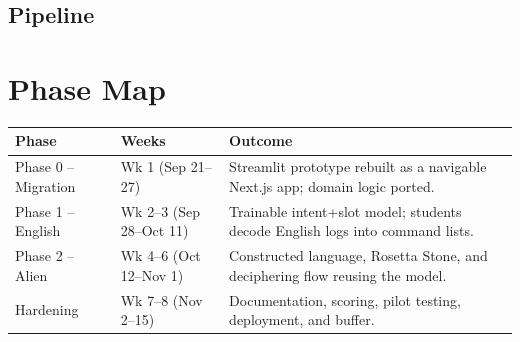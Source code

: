 \documentclass[a4]{article}
\begin{document}
\subsection*{Pipeline}
\begin{center}
\end{center}

\section{Phase Map}

\begin{center}
\renewcommand{\arraystretch}{1.3}
\begin{tabularx}{\linewidth}{@{}p{3.2cm}p{3.4cm}X@{}}
\toprule
\textbf{Phase} & \textbf{Weeks} & \textbf{Outcome} \\
\midrule
\cellcolor{phase0}Phase 0 -- Migration &
Wk 1 (Sep 21--27) &
Streamlit prototype rebuilt as a navigable Next.js app; domain logic ported. \\

\cellcolor{phase1}Phase 1 -- English &
Wk 2--3 (Sep 28--Oct 11) &
Trainable intent+slot model; students decode English logs into command lists. \\

\cellcolor{phase2}Phase 2 -- Alien &
Wk 4--6 (Oct 12--Nov 1) &
Constructed language, Rosetta Stone, and deciphering flow reusing the model. \\

\cellcolor{bufferc}Hardening &
Wk 7--8 (Nov 2--15) &
Documentation, scoring, pilot testing, deployment, and buffer. \\
\bottomrule
\end{tabularx}
\end{center}
\end{document}

